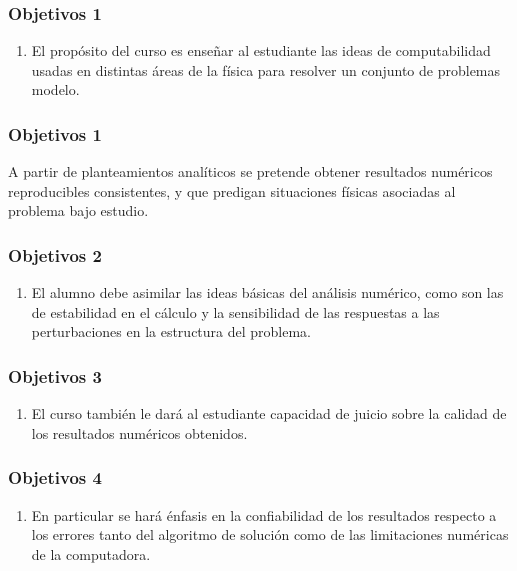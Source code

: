 \documentclass[12pt]{beamer}
\begin{document}
\begin{frame}
\frametitle{Objetivos 1}
\begin{enumerate}[<+->]
\item  El propósito del curso es enseñar al estudiante las ideas de computabilidad usadas en distintas áreas de la física para resolver un conjunto de problemas modelo. 
\seti
\end{enumerate}
\end{frame}
\begin{frame}
\frametitle{Objetivos 1}    
A partir de planteamientos analíticos se pretende obtener resultados numéricos reproducibles consistentes, y que predigan situaciones físicas asociadas al problema bajo estudio.
\end{frame}
\begin{frame}
\frametitle{Objetivos 2}
\begin{enumerate}[<+->]
\conti
\item El alumno debe asimilar las ideas básicas del análisis numérico, como son las de estabilidad en el cálculo y la sensibilidad de las respuestas a las perturbaciones en la estructura del problema.
\seti
\end{enumerate}
\end{frame}
\begin{frame}
\frametitle{Objetivos 3}
\begin{enumerate}[<+->]
\conti
\item El curso también le dará al estudiante capacidad de juicio sobre la calidad de los resultados numéricos obtenidos.
\seti
\end{enumerate}
\end{frame}
\begin{frame}
\frametitle{Objetivos 4}
\begin{enumerate}[<+->]
\conti
\item En particular se hará énfasis en la confiabilidad de los resultados respecto a los errores tanto del algoritmo de solución como de las limitaciones numéricas de la computadora. 
\conti
\end{enumerate}
\end{frame}
\end{document}

